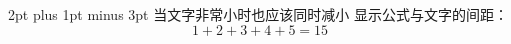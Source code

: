 \setlength\abovedisplayskip
  {2pt plus 1pt minus 3pt}
当文字非常小时也应该同时减小
显示公式与文字的间距：
\[ 1+2+3+4+5 = 15 \]
